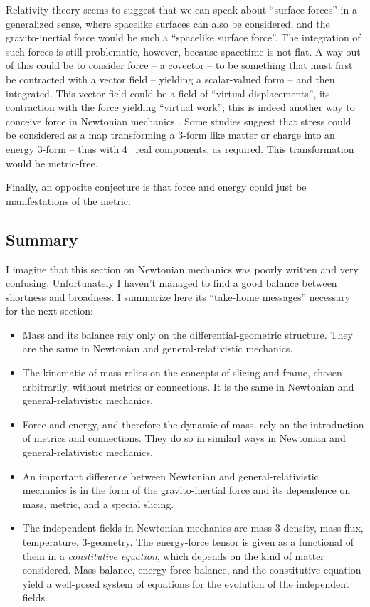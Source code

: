 \documentclass[\ifafour a4paper,12pt,\else a5paper,10pt,\fi%
onecolumn,oneside,article,%
british%
]{memoir}
\theoremstyle{remark}
\theoremstyle{innote}
\newcommand*{\citep}{\parencites}
\renewcommand*{\|}{\nonscript\,\vert\nonscript\;\mathopen{}}
\newcommand*{\sect}{\S}%
\begin{document}
Relativity theory seems to suggest that we can speak about \enquote{surface
  forces} in a generalized sense, where spacelike surfaces can also be
considered, and the gravito-inertial force would be such a
\enquote{spacelike surface force}. The integration of such forces is still
problematic, however, because spacetime is not flat. A way out of this
could be to consider force -- a covector -- to be something that must first
be contracted with a vector field -- yielding a scalar-valued form -- and
then integrated. This vector field could be a field of \enquote{virtual
  displacements}, its contraction with the force yielding \enquote{virtual
  work}; this is indeed another way to conceive force in Newtonian
mechanics \citep[\sect~238]{truesdelletal1960}. Some studies
\citep{segev2002,hehletal2003,segev1986,segevetal1999,segev2000,segev2000b}
suggest that stress could be considered as a map transforming a 3-form like
matter or charge into an energy 3-form -- thus with 4~ real
components, as required. This transformation would be metric-free.

Finally, an opposite conjecture is that force and energy could just be
manifestations of the metric.

\subsection{Summary}
\label{sec:summary_newtonian}

I imagine that this section on Newtonian mechanics was poorly written and
very confusing. Unfortunately I haven't managed to find a good balance
between shortness and broadness. I summarize here its \enquote{take-home
  messages} necessary for the next section:
\begin{itemize}
\item Mass and its balance rely only on the differential-geometric
  structure. They are the same in Newtonian and general-relativistic
  mechanics.
\item The kinematic of mass relies on the concepts of slicing and frame,
  chosen arbitrarily, without metrics or connections. It is the same in
  Newtonian and general-relativistic mechanics.
\item Force and energy, and therefore the dynamic of mass, rely on the
  introduction of metrics and connections. They do so in similarl ways in
  Newtonian and general-relativistic mechanics.
\item An important difference between Newtonian and general-relativistic
  mechanics is in the form of the gravito-inertial force and its dependence
  on mass, metric, and a special slicing.
\item The independent fields in Newtonian mechanics are mass 3-density,
  mass flux, temperature, 3-geometry. The energy-force tensor is given as a
  functional of them in a \emph{constitutive equation}, which depends on
  the kind of matter considered. Mass balance, energy-force balance, and
  the constitutive equation yield a well-posed system of equations for the
  evolution of the independent fields.
\end{itemize}
\end{document}
